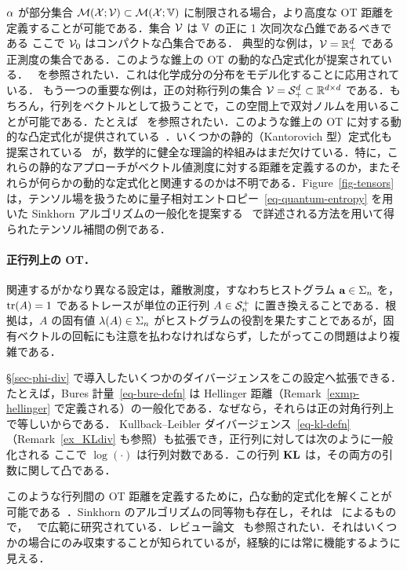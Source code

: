 $\alpha$ が部分集合 $\mathcal{M}(\mathcal{X};\mathcal{V}) \subset \mathcal{M}(\mathcal{X};\mathbb{V})$ に制限される場合，より高度な OT 距離を定義することが可能である．集合 $\mathcal{V}$ は $\mathbb{V}$ の正に 1 次同次な凸錐であるべきである
ここで $\mathcal{V}_0$ はコンパクトな凸集合である．
%
典型的な例は，$\mathcal{V}=\mathbb{R}_+^d$ である正測度の集合である．このような錐上の OT の動的な凸定式化が提案されている．~\citep{MatthesPositive} を参照されたい．これは化学成分の分布をモデル化することに応用されている．
%
もう一つの重要な例は，正の対称行列の集合 $\mathcal{V}=\mathcal{S}_+^d \subset \mathbb{R}^{d \times d}$ である．もちろん，行列をベクトルとして扱うことで，この空間上で双対ノルムを用いることが可能である．たとえば~\citep{Ning2014metrics} を参照されたい．このような錐上の OT に対する動的な凸定式化が提供されている~\citep{Chen2016,JiangSpectral}．いくつかの静的（Kantorovich 型）定式化も提案されている~\citep{ning2015matrix,2016-peyre-qot} が，数学的に健全な理論的枠組みはまだ欠けている．特に，これらの静的なアプローチがベクトル値測度に対する距離を定義するのか，またそれらが何らかの動的な定式化と関連するのかは不明である．Figure~\ref{fig-tensors} は，テンソル場を扱うために量子相対エントロピー~\eqref{eq-quantum-entropy} を用いた Sinkhorn アルゴリズムの一般化を提案する~\citep{2016-peyre-qot} で詳述される方法を用いて得られたテンソル補間の例である．

\paragraph{正行列上の OT．}

関連するがかなり異なる設定は，離散測度，すなわちヒストグラム $\mathrm{\textbf{a}} \in \Sigma_n$ を，$\operatorname{tr}(A)=1$ であるトレースが単位の正行列 $A \in \mathcal{S}_n^+$ に置き換えることである．根拠は，$A$ の固有値 $\lambda(A) \in \Sigma_n$ がヒストグラムの役割を果たすことであるが，固有ベクトルの回転にも注意を払わなければならず，したがってこの問題はより複雑である．

\S\ref{sec-phi-div} で導入したいくつかのダイバージェンスをこの設定へ拡張できる．たとえば，Bures 計量~\eqref{eq-bure-defn} は Hellinger 距離（Remark~\ref{exmp-hellinger} で定義される）の一般化である．なぜなら，それらは正の対角行列上で等しいからである．
%
Kullback--Leibler ダイバージェンス~\eqref{eq-kl-defn}（Remark~\ref{ex_KLdiv} も参照）も拡張でき，正行列に対しては次のように一般化される
ここで $\log(\cdot)$ は行列対数である．この行列 $\mathrm{\textbf{KL}}$ は，その両方の引数に関して凸である．

このような行列間の OT 距離を定義するために，凸な動的定式化を解くことが可能である~\citep{Carlen2014,Chen2016,ChenGangbo17}．Sinkhorn のアルゴリズムの同等物も存在し，それは~\citet{gurvits2004classical} によるもので，~\citep{georgiou2015positive} で広範に研究されている．レビュー論文~\citep{ReviewSinkhorn} も参照されたい．それはいくつかの場合にのみ収束することが知られているが，経験的には常に機能するように見える．


